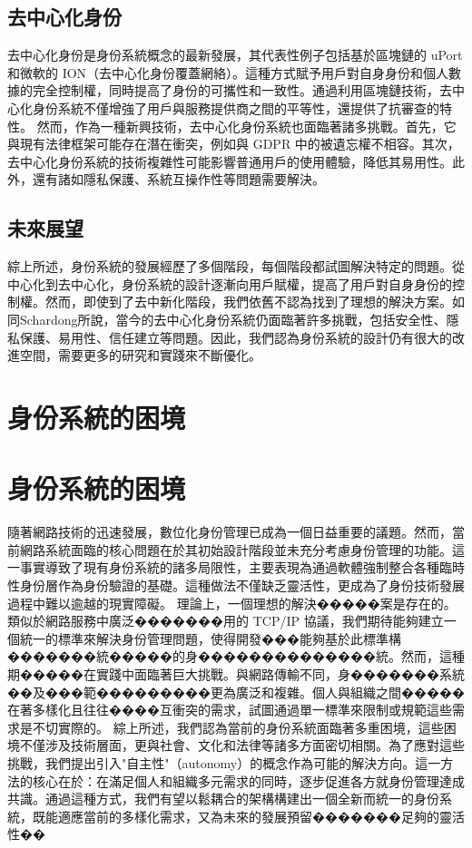\subsection{去中心化身份}
去中心化身份是身份系統概念的最新發展\cite{preukschat2021self}，其代表性例子包括基於區塊鏈的 uPort 和微軟的 ION（去中心化身份覆蓋網絡）\cite{lundkvist2017uport, microsoft2020ion}。這種方式賦予用戶對自身身份和個人數據的完全控制權，同時提高了身份的可攜性和一致性。通過利用區塊鏈技術，去中心化身份系統不僅增強了用戶與服務提供商之間的平等性，還提供了抗審查的特性。
然而，作為一種新興技術，去中心化身份系統也面臨著諸多挑戰\cite{s22155641}。首先，它與現有法律框架可能存在潛在衝突，例如與 GDPR 中的被遺忘權不相容\cite{finck2018blockchains}。其次，去中心化身份系統的技術複雜性可能影響普通用戶的使用體驗，降低其易用性\cite{kubach2020self}。此外，還有諸如隱私保護、系統互操作性等問題需要解決。
\subsection{未來展望}
綜上所述，身份系統的發展經歷了多個階段，每個階段都試圖解決特定的問題。從中心化到去中心化，身份系統的設計逐漸向用戶賦權，提高了用戶對自身身份的控制權。然而，即使到了去中新化階段，我們依舊不認為找到了理想的解決方案。如同Schardong\cite{s22155641}所說，當今的去中心化身份系統仍面臨著許多挑戰，包括安全性、隱私保護、易用性、信任建立等問題。因此，我們認為身份系統的設計仍有很大的改進空間，需要更多的研究和實踐來不斷優化。
\section{身份系統的困境}
\section{身份系統的困境}
隨著網路技術的迅速發展，數位化身份管理已成為一個日益重要的議題。然而，當前網路系統面臨的核心問題在於其初始設計階段並未充分考慮身份管理的功能\cite{cameron2005laws}。這一事實導致了現有身份系統的諸多局限性，主要表現為通過軟體強制整合各種臨時性身份層作為身份驗證的基礎。這種做法不僅缺乏靈活性，更成為了身份技術發展過程中難以逾越的現實障礙。\newline
理論上，一個理想的解決�����案是存在的。類似於網路服務中廣泛�������用的 TCP/IP 協議，我們期待能夠建立一個統一的標準來解決身份管理問題，使得開發���能夠基於此標準構�������統�����的身��������������統。然而，這種期�����在實踐中面臨著巨大挑戰。與網路傳輸不同，身�������系統��及���範���������更為廣泛和複雜。個人與組織之間�����在著多樣化且往往����互衝突的需求，試圖通過單一標準來限制或規範這些需求是不切實際的。\newline
綜上所述，我們認為當前的身份系統面臨著多重困境，這些困境不僅涉及技術層面，更與社會、文化和法律等諸多方面密切相關。為了應對這些挑戰，我們提出引入"自主性"（autonomy）的概念作為可能的解決方向。這一方法的核心在於：在滿足個人和組織多元需求的同時，逐步促進各方就身份管理達成共識。通過這種方式，我們有望以鬆耦合的架構構建出一個全新而統一的身份系統，既能適應當前的多樣化需求，又為未來的發展預留�������足夠的靈活性��
